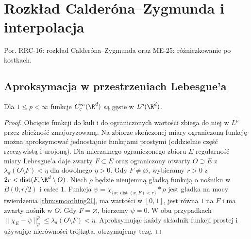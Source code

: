 \setcounter{section}{31}
\section{Rozkład Calderóna--Zygmunda i interpolacja}
\label{sec:dt-calderon-zygmund}
\providecommand{\atlasref}[2]{#2}
Por. \atlasref{PDE-16::lem:pde16-cz-decomp}{RRC-16: rozkład Calderóna--Zygmunda}
oraz \atlasref{ME-25::cor:cubes-differentiation-25}{ME-25: różniczkowanie po kostkach}.
\subsection{Aproksymacja w przestrzeniach Lebesgue'a}

\begin{twierdzenie}
\label{thm:dt-test-density}
Dla $1\le p<\infty$ funkcje $C_c^\infty(\R^d)$
są gęste w $L^p(\R^d)$.
\end{twierdzenie}
\begin{proof}
Obcięcie funkcji do kuli i do ograniczonych wartości
zbiega do niej w $L^p$ przez zbieżność zmajoryzowaną.
Na zbiorze skończonej miary ograniczoną funkcję
można aproksymować jednostajnie funkcjami prostymi
(oddzielnie część rzeczywistą i urojoną).
Dla mierzalnego ograniczonego zbioru $E$ regularność
miary Lebesgue'a daje zwarty $F\subset E$ oraz
ograniczony otwarty $O\supset E$ z
$\lambda_d(O\setminus F)<\eta$ dla dowolnego $\eta>0$.
Gdy $F\ne\varnothing$, wybieramy $r>0$ z
$2r<\operatorname{dist}(F,\R^d\setminus O)$.
Niech $\rho$ będzie nieujemną gładką funkcją o nośniku
w $B(0,r/2)$ i całce $1$. Funkcja
$\psi=\chi_{\{x:\operatorname{dist}(x,F)<r\}}*\rho$
jest gładka na mocy twierdzenia \ref{thm:smoothing21},
ma wartości w $[0,1]$, jest równa $1$ na $F$
i ma zwarty nośnik w $O$. Gdy $F=\varnothing$,
bierzemy $\psi=0$. W obu przypadkach
$\|\chi_E-\psi\|_p^p\le\lambda_d(O\setminus F)<\eta$.
Aproksymując każdy składnik funkcji prostej i używając
nierówności trójkąta, otrzymujemy tezę.
\end{proof}

